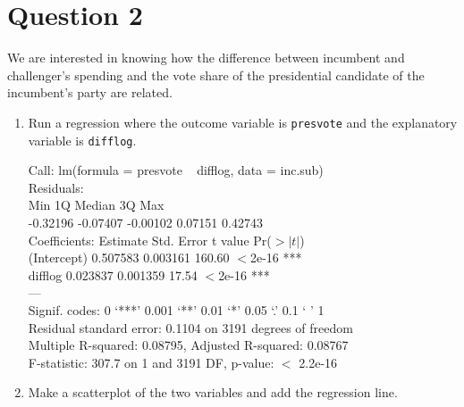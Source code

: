 \documentclass[12pt,letterpaper]{article}
\begin{document}
\vspace{.5cm}

\section*{Question 2}
\noindent We are interested in knowing how the difference between incumbent and challenger's spending and the vote share of the presidential candidate of the incumbent's party are related.	\vspace{.25cm}
	\begin{enumerate}
		\item Run a regression where the outcome variable is \texttt{presvote} and the explanatory variable is \texttt{difflog}.	
		
		\vspace{.15cm}
		 
		\vspace{.15cm}
		\noindent Call:
		lm(formula = presvote ~ difflog, data = inc.sub)\\
		\vspace{.15cm}
		Residuals:\\
		Min       1Q   Median       3Q      Max \\
		-0.32196 -0.07407 -0.00102  0.07151  0.42743\\ 
		\vspace{.15cm}
		Coefficients:
		Estimate Std. Error t value Pr($>|t|$)\\    
		(Intercept) 0.507583   0.003161  160.60   $<$2e-16 ***\\
		difflog     0.023837   0.001359   17.54   $<$2e-16 ***\\
		---\\
		Signif. codes:  0 ‘***’ 0.001 ‘**’ 0.01 ‘*’ 0.05 ‘.’ 0.1 ‘ ’ 1\\
		\vspace{.15cm}
		Residual standard error: 0.1104 on 3191 degrees of freedom\\
		Multiple R-squared:  0.08795,	Adjusted R-squared:  0.08767 \\
		F-statistic: 307.7 on 1 and 3191 DF,  p-value: $<$ 2.2e-16\\
		\vspace{.15cm}
		\item Make a scatterplot of the two variables and add the regression line. 	
		\vspace{.15cm}
		 
		\vspace{.15cm}
		\begin{figure}[h!]\centering
			

\end{figure}
\end{enumerate}
\end{document}
